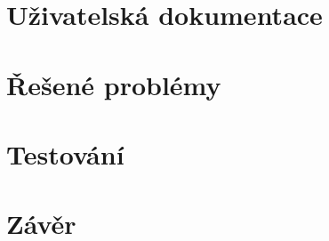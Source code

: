 \documentclass[12pt, a4paper]{article}
\begin{document}
	
	\section{Uživatelská dokumentace}
	
	\section{Řešené problémy}
	
	\section{Testování}
	
	\section{Závěr}
	
	
	\newpage
	\begin{thebibliography}{9}
		
	\end{thebibliography}
	
\end{document}
